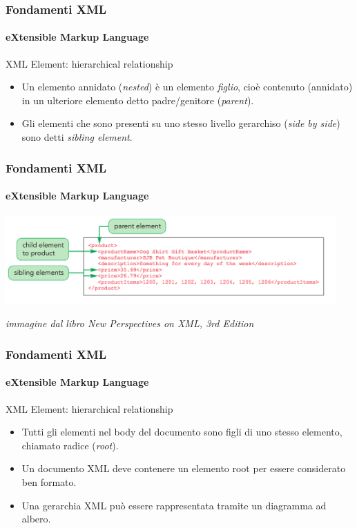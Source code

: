 \begin{frame}
    \frametitle{Fondamenti XML}
    \framesubtitle{eXtensible Markup Language}
    \addtocounter{nframe}{1}

	\begin{block}{XML Element: hierarchical relationship}
		\begin{itemize}
			\item Un elemento annidato (\textit{nested}) è un elemento \textit{figlio}, cioè contenuto (annidato) in un ulteriore elemento detto padre/genitore (\textit{parent}).
			\item Gli elementi che sono presenti su uno stesso livello gerarchiso (\textit{side by side}) sono detti \textit{sibling element}.
		\end{itemize}
	\end{block}

\end{frame}

\begin{frame}
	\frametitle{Fondamenti XML}
	\framesubtitle{eXtensible Markup Language}
	\addtocounter{nframe}{1}

	\begin{center}
		\includegraphics[width=0.95\textwidth]{imgs/XML-Parent-Child-Sibling.png}
    \end{center}
\begin{tiny}\textit{immagine dal libro New Perspectives on XML, 3rd Edition}\end{tiny}

\end{frame}

\begin{frame}
    \frametitle{Fondamenti XML}
    \framesubtitle{eXtensible Markup Language}
    \addtocounter{nframe}{1}

	\begin{block}{XML Element: hierarchical relationship}
		\begin{itemize}
			\item Tutti gli elementi nel body del documento sono figli di uno stesso elemento, chiamato radice (\textit{root}).
			\item Un documento XML deve contenere un elemento root per essere considerato ben formato.
			\item Una gerarchia XML può essere rappresentata tramite un diagramma ad albero.
		\end{itemize}
	\end{block}

\end{frame}

